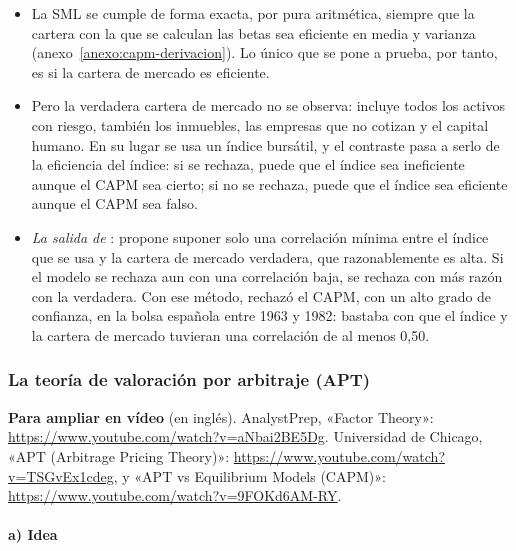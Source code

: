 \documentclass[11pt]{article}
\begin{document}
\begin{itemize}
  \begin{itemize}
  \item La SML se cumple de forma exacta, por pura aritmética, siempre que la cartera con la que se calculan las betas sea eficiente en media y varianza (anexo~\ref{anexo:capm-derivacion}). Lo único que se pone a prueba, por tanto, es si la cartera de mercado es eficiente.
  \item Pero la verdadera cartera de mercado no se observa: incluye todos los activos con riesgo, también los inmuebles, las empresas que no cotizan y el capital humano. En su lugar se usa un índice bursátil, y el contraste pasa a serlo de la eficiencia del índice: si se rechaza, puede que el índice sea ineficiente aunque el CAPM sea cierto; si no se rechaza, puede que el índice sea eficiente aunque el CAPM sea falso.
  \item \emph{La salida de }: \textcite{Shanken1987Proxies} propone suponer solo una correlación mínima entre el índice que se usa y la cartera de mercado verdadera, que razonablemente es alta. Si el modelo se rechaza aun con una correlación baja, se rechaza con más razón con la verdadera. Con ese método, \textcite{Rubio1986Roll} rechazó el CAPM, con un alto grado de confianza, en la bolsa española entre 1963 y 1982: bastaba con que el índice y la cartera de mercado tuvieran una correlación de al menos 0,50.
  \end{itemize}
\end{itemize}

\subsubsection{La teoría de valoración por arbitraje (APT)}\label{sec:apt}

\begin{anotaciones}
\textbf{Para ampliar en vídeo} (en inglés). AnalystPrep, «Factor Theory»: \url{https://www.youtube.com/watch?v=aNbai2BE5Dg}. Universidad de Chicago, «APT (Arbitrage Pricing Theory)»: \url{https://www.youtube.com/watch?v=TSGvEx1cdeg}, y «APT vs Equilibrium Models (CAPM)»: \url{https://www.youtube.com/watch?v=9FOKd6AM-RY}.
\end{anotaciones}

\paragraph{a) Idea}
\end{document}
